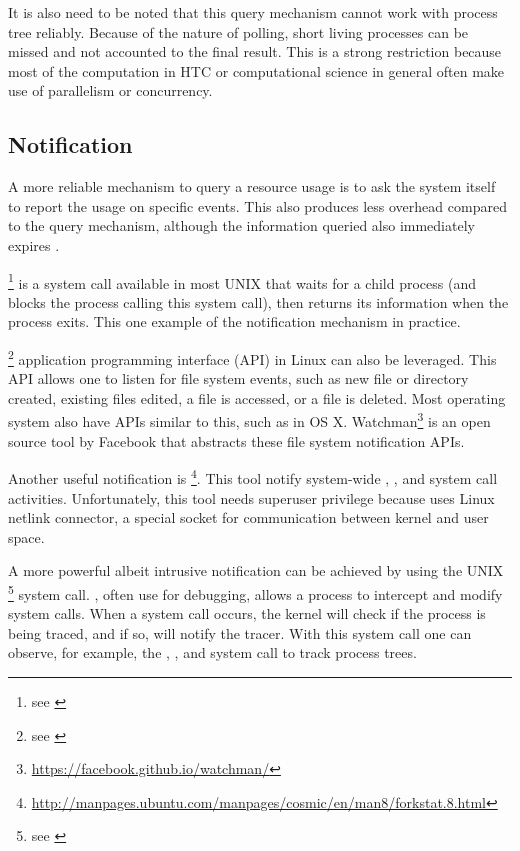 It is also need to be noted that this query mechanism cannot work with process tree reliably.
Because of the nature of polling, short living processes can be missed and not accounted to the final result.
This is a strong restriction because most of the computation in HTC or computational science in general often make use of parallelism or concurrency.


\subsection{Notification}

A more reliable mechanism to query a resource usage is to ask the system itself to report the usage on specific events.
This also produces less overhead compared to the query mechanism, although the information queried also immediately expires \citep{juvePracticalResourceMonitoring2015}.

\footnote{see \href{https://linux.die.net/man/2/wait4}{}} is a system call available in most UNIX that waits for a child process (and blocks the process calling this system call), then returns its  information when the process exits.
This one example of the notification mechanism in practice.

\footnote{see \href{https://linux.die.net/man/7/inotify}{}} application programming interface (API) in Linux can also be leveraged.
This API allows one to listen for file system events, such as new file or directory created, existing files edited, a file is accessed, or a file is deleted.
Most operating system also have APIs similar to this, such as  in OS X. Watchman\footnote{\href{https://facebook.github.io/watchman/}{https://facebook.github.io/watchman/}} is an open source tool by Facebook that abstracts these file system notification APIs.

Another useful notification is \footnote{\href{http://manpages.ubuntu.com/manpages/cosmic/en/man8/forkstat.8.html}{http://manpages.ubuntu.com/manpages/cosmic/en/man8/forkstat.8.html}}.
This tool notify system-wide , , and  system call activities.
Unfortunately, this tool needs superuser privilege because uses Linux netlink connector, a special socket for communication between kernel and user space.

A more powerful albeit intrusive notification can be achieved by using the UNIX \footnote{see \href{https://linux.die.net/man/2/ptrace}{}} system call.
, often use for debugging, allows a process to intercept and modify system calls.
When a system call occurs, the kernel will check if the process is being traced, and if so, will notify the tracer.
With this system call one can observe, for example, the , , and  system call to track process trees.

